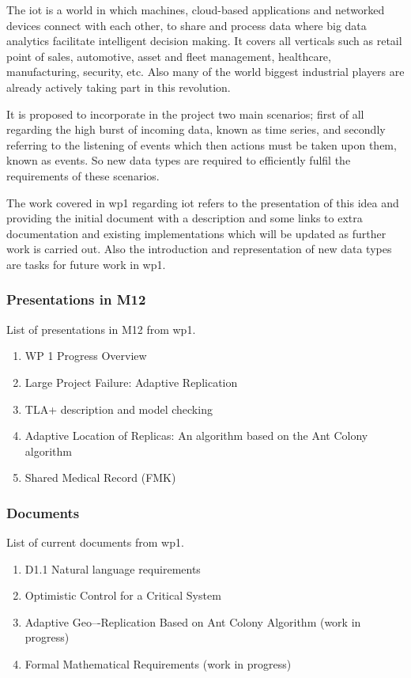 \documentclass[12pt,twoside]{article}
\begin{document}
The \gls{iot} is a world in which machines, cloud-based applications and networked devices connect with each other, to share and process data where big data analytics facilitate intelligent decision making. It covers all verticals such as retail point of sales, automotive, asset and fleet management, healthcare, manufacturing, security, etc. Also many of the world biggest industrial players are already actively taking part in this revolution.

It is proposed to incorporate in the project two main scenarios; first of all regarding the high burst of incoming data, known as time series, and secondly referring to the listening of events which then actions must be taken upon them, known as events. So new data types are required to efficiently fulfil the requirements of these scenarios.

The work covered in \gls{wp1} regarding \gls{iot} refers to the presentation of this idea and providing the initial document with a description and some links to extra documentation and existing implementations which will be updated as further work is carried out. Also the introduction and representation of new data types are tasks for future work in \gls{wp1}.


\subsubsection{Presentations in M12}
List of presentations in M12 from \gls{wp1}.
\begin{enumerate}
	\item WP 1 Progress Overview
	\item Large Project Failure: Adaptive Replication
	\item TLA+ description and model checking
	\item Adaptive Location of Replicas: An algorithm based on the Ant Colony algorithm
	\item Shared Medical Record (FMK)
\end{enumerate}


\subsubsection{Documents}
List of current documents from \gls{wp1}.
\begin{enumerate}
	\item D1.1 Natural language requirements
	\item Optimistic Control for a Critical System
	\item Adaptive Geo–-Replication Based on Ant Colony Algorithm (work in progress)
	\item Formal Mathematical Requirements (work in progress)
\end{enumerate}
\end{document}
